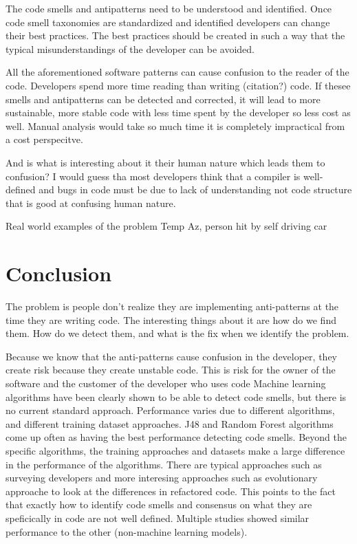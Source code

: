 \documentclass[conference]{IEEEtran}
\begin{document}
The code smells and antipatterns need to be understood and identified.
Once code smell taxonomies are standardized and identified developers can change their best practices.
The best practices should be created in such a way that the typical misunderstandings of the developer can be avoided.

All the aforementioned software patterns can cause confusion to the reader of the code. Developers spend more time reading than writing (citation?) code. If thesee smells and antipatterns can be detected and corrected, it will lead to more sustainable, more stable code with less time spent by the developer so less cost as well.
Manual analysis would take so much time it is completely impractical from a cost perspecitve.

And is what is interesting about it their human nature which leads them to confusion?
I would guess tha most developers think that a compiler is well-defined and bugs in code must be due to lack of understanding not code structure that is good at confusing human nature.

Real world examples of the problem
Temp Az, person hit by self driving car\cite{noauthor_how_nodate}

\section{Conclusion}
The problem is people don't realize they are implementing anti-patterns at the time they are writing code.
The interesting things about it are how do we find them. 
How do we detect them, and what is the fix when we identify the problem.

Because we know that the anti-patterns cause confusion in the developer, they create risk because they create unstable code. 
This is risk for the owner of the software and the customer of the developer who uses code
Machine learning algorithms have been clearly shown to be able to detect code smells, but there is no current standard approach. 
Performance varies due to different algorithms, and different training dataset approaches. 
J48 and Random Forest algorithms come up often as having the best performance detecting code smells.
Beyond the specific algorithms, the training approaches and datasets make a large difference in the performance of the algorithms. 
There are typical approaches such as surveying developers and more interesing approaches such as evolutionary approache to look at the differences in refactored code.
This points to the fact that exactly how to identify code smells and consensus on what they are speficically in code are not well defined. Multiple studies showed similar performance to the other (non-machine learning models).
\end{document}
